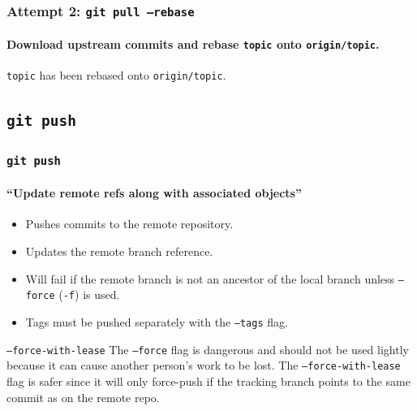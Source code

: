 \documentclass{beamer}
\newcommand\gitcmd[1]{\texttt{git #1}}
\newcommand\gflag[1]{\texttt{#1}}
\newcommand\gbranch[1]{\texttt{#1}}
\newcommand\gremotebranch[1]{\texttt{#1}}
\begin{document}
\begin{frame}
  \frametitle{Attempt 2: \gitcmd{pull --rebase}}
  \framesubtitle{Download upstream commits and rebase \gbranch{topic} onto \gremotebranch{origin/topic}.}
  \begin{figure}
    \centering
  \end{figure}

  \gbranch{topic} has been rebased onto \gremotebranch{origin/topic}.
\end{frame}

\subsection{\gitcmd{push}}

\begin{frame}
  \frametitle{\gitcmd{push}}
  \framesubtitle{``Update remote refs along with associated objects''}
  \begin{itemize}
    \item Pushes commits to the remote repository.
    \item Updates the remote branch reference.
    \item Will fail if the remote branch is not an ancestor of the local branch unless \gflag{--force} (\gflag{-f}) is used.
    \item Tags must be pushed separately with the \gflag{--tags} flag.
  \end{itemize}
  \vfill
  \begin{block}{\gflag{--force-with-lease}}
    The \gflag{--force} flag is dangerous and should not be used lightly because it can cause another person's work to be lost.
    The \gflag{--force-with-lease} flag is safer since it will only force-push if the tracking branch points to the same commit as on the remote repo.
  \end{block}
\end{frame}
\end{document}
